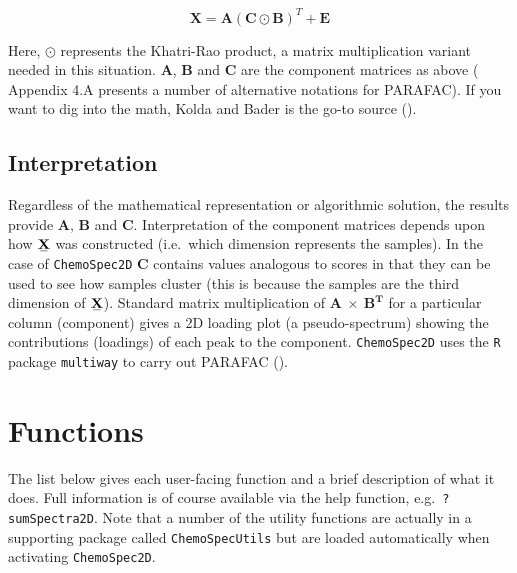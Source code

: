 \documentclass[10pt,twocolumn,twoside,]{pinp}
\begin{document}
\[
\mathbf{X} = \mathbf{A}(\mathbf{C} \odot \mathbf{B})^T + \mathbf{E}
\]

Here, \(\odot\) represents the Khatri-Rao product, a matrix
multiplication variant needed in this situation. \(\mathbf{A}\),
\(\mathbf{B}\) and \(\mathbf{C}\) are the component matrices as above
(\cite{Bro2003b, Smilde2004} Appendix 4.A presents a number of
alternative notations for PARAFAC). If you want to dig into the math,
Kolda and Bader is the go-to source (\cite{Kolda2009}).

\hypertarget{interpretation}{%
\subsection{Interpretation}\label{interpretation}}

Regardless of the mathematical representation or algorithmic solution,
the results provide \(\mathbf{A}\), \(\mathbf{B}\) and \(\mathbf{C}\).
Interpretation of the component matrices depends upon how
\(\stackunder[1.2pt]{$\mathbf{X}$}{\rule{1.2ex}{.075ex}}\) was
constructed (i.e.~which dimension represents the samples). In the case
of \texttt{ChemoSpec2D} \(\mathbf{C}\) contains values analogous to
scores in that they can be used to see how samples cluster (this is
because the samples are the third dimension of
\(\stackunder[1.2pt]{$\mathbf{X}$}{\rule{1.2ex}{.075ex}}\)). Standard
matrix multiplication of \(\mathbf{A} \ \times \ \mathbf{B^T}\) for a
particular column (component) gives a 2D loading plot (a
pseudo-spectrum) showing the contributions (loadings) of each peak to
the component. \texttt{ChemoSpec2D} uses the \texttt{R} package
\texttt{multiway} to carry out PARAFAC (\cite{Helwig2017}).

\hypertarget{functions}{%
\section{Functions}\label{functions}}

The list below gives each user-facing function and a brief description
of what it does. Full information is of course available via the help
function, e.g.~\texttt{?sumSpectra2D}. Note that a number of the utility
functions are actually in a supporting package called
\texttt{ChemoSpecUtils} but are loaded automatically when activating
\texttt{ChemoSpec2D}.
\end{document}
